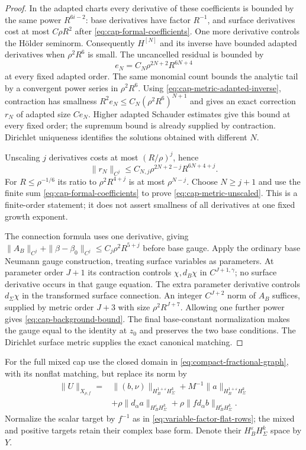 \documentclass[11pt]{amsart}
\theoremstyle{definition}
\theoremstyle{remark}
\theoremstyle{plain}
\begin{document}
\begin{proof}
In the adapted charts every derivative of these coefficients is
bounded by the same power $R^{6i-2}$: base derivatives have factor
$R^{-1}$, and surface derivatives cost at most $C\rho R^2$
after \eqref{eq:cap-formal-coefficients}. One more derivative
controls the H\"older seminorm. Consequently $H^{[N]}$ and its
inverse have bounded adapted derivatives when $\rho^2R^6$ is
small. The uncancelled residual is bounded by
\[
 e_N=C_N\rho^{2N+2}R^{6N+4}
\]
at every fixed adapted order. The same monomial count bounds
the analytic tail by a convergent power series in $\rho^2R^6$.
Using \eqref{eq:cap-metric-adapted-inverse}, contraction has
smallness $R^2e_N\leq C_N(\rho^2R^6)^{N+1}$ and gives an exact
correction $r_N$ of adapted size $Ce_N$. Higher adapted Schauder
estimates give this bound at every fixed order; the supremum
bound is already supplied by contraction. Dirichlet uniqueness
identifies the solutions obtained with different $N$.

Unscaling $j$ derivatives costs at most $(R/\rho)^j$, hence
\[
 \|r_N\|_{C^j}\leq C_{N,j}\rho^{2N+2-j}R^{6N+4+j}.
\]
For $R\leq\rho^{-1/6}$ its ratio to $\rho^2R^{4+j}$ is at
most $\rho^{N-j}$. Choose $N\geq j+1$ and use the finite sum
\eqref{eq:cap-formal-coefficients} to prove
\eqref{eq:cap-metric-unscaled}. This is a finite-order statement;
it does not assert smallness of all derivatives at one fixed
growth exponent.

The connection formula uses one derivative, giving
$\|A_B\|_{C^j}+\|\beta-\beta_0\|_{C^j}
\leq C_j\rho^2R^{5+j}$ before base gauge. Apply the ordinary
base Neumann gauge construction, treating surface variables as
parameters. At parameter order $J+1$ its contraction controls
$\chi,d_B\chi$ in $C^{J+1,\gamma}$; no surface derivative
occurs in that gauge equation. The extra parameter derivative
controls $d_\Sigma\chi$ in the transformed surface connection.
An integer $C^{J+2}$ norm of $A_B$ suffices, supplied by metric
order $J+3$ with size $\rho^2R^{J+7}$. Allowing one further
power gives \eqref{eq:cap-background-bound}. The final
base-constant normalization makes the gauge equal to the identity
at $z_0$ and preserves the two base conditions. The Dirichlet
surface metric supplies the exact canonical matching.
\end{proof}

For the full mixed cap use the closed domain in
\eqref{eq:compact-fractional-graph}, with its nonflat matching,
but replace its norm by
\begin{equation}\label{eq:capped-mixed-graph}
 \begin{split}
 \|U\|_{X_{\rho,f}}={}&
 \|(b,\nu)\|_{H_B^{1+\varepsilon}H_\Sigma^k}
 +M^{-1}\|a\|_{H_B^{1+\varepsilon}H_\Sigma^k}\\
 &+\rho\|d_\alpha a\|_{H_B^\varepsilon H_\Sigma^k}
 +\rho\|f d_\alpha b\|_{H_B^\varepsilon H_\Sigma^k}.
 \end{split}
\end{equation}
Normalize the scalar target by $f^{-1}$ as in
\eqref{eq:variable-factor-flat-rows}; the mixed and positive
targets retain their complex base form. Denote their
$H_B^\varepsilon H_\Sigma^k$ space by $Y$.
\end{document}
